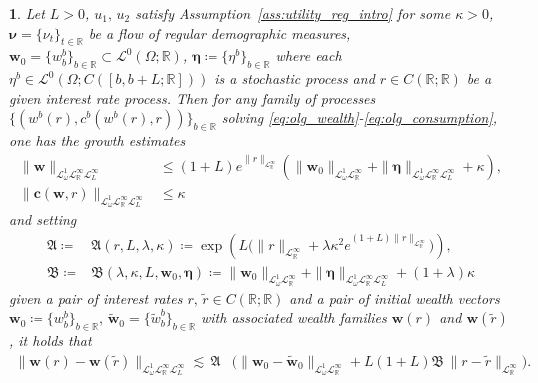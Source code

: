 \documentclass[11pt,oneside,english,reqno,dvipsnames,table]{amsart}
\numberwithin{equation}{section}
\theoremstyle{plain}
\theoremstyle{definition}
\theoremstyle{remark}
\theoremstyle{plain}
\newtheorem{lem}[thm]{\protect\lemmaname}
\theoremstyle{plain}
\theoremstyle{plain}
\theoremstyle{plain}
\theoremstyle{plain}
\theoremstyle{plain}
\theoremstyle{plain}
\providecommand{\lemmaname}{Lemma}
\newcommand{\red}[1]{#1}
\newcommand{\bc}{\mathbf{c}}
\newcommand{\bw}{\mathbf{w}}
\newcommand{\mbR}{\mathbb{R}}
\newcommand{\mfA}{\mathfrak{A}}
\newcommand{\mfB}{\mathfrak{B}}
\newcommand{\msL}{\mathscr{L}}
\newcommand{\bmeta}{\boldsymbol{\eta}}
\newcommand{\bnu}{\boldsymbol{\nu}}
\numberwithin{thm}{section}
\begin{document}
\begin{lem}\label{lem:olg_growth_stable}
	 Let $L>0$, $u_1,\, u_2$ satisfy Assumption~\ref{ass:utility_reg_intro} for some $\kappa >0$, $\bnu = \{\nu_t\}_{t\in \mbR}$ be a flow of \emph{regular demographic measures}, $\bw_0  = \{w^b_b\}_{b\in \mbR}\subset\msL^0(\Omega;\mbR)$, $\bmeta \coloneqq \{\eta^b\}_{b\in \mbR}$ where each $\eta^b \in \msL^0(\Omega;C([b,b+L;\mbR]))$ is a stochastic process and $r \in C(\mbR;\mbR)$ be a given interest rate process. %
     Then for any family of processes $\{(w^b(r),c^b(w^b(r),r))\}_{b\in \mbR}$ solving  \eqref{eq:olg_wealth}-\eqref{eq:olg_consumption}, one has the growth estimates
	 \begin{align}
	 	 \|\bw\|_{\msL^1_\omega \msL^\infty_{\mbR} \msL^\infty_{L}} &\leq  (1+L)e^{\|r\|_{\msL^\infty_{\mbR}}} \left(\|\bw_0\|_{\msL^1_\omega \msL^\infty_\mbR } +    \|\bmeta\|_{ \msL^1_\omega \msL^\infty_{\mbR} \msL^\infty_{L}} + \kappa \right), \label{eq:olg_wealth_apriori_bound} \\
          \|\bc(\bw,r)\|_{\msL^1_\omega  \msL^\infty_{\mbR}\msL^\infty_{L}}  &\leq \kappa \label{eq:olg_consumption_bdd}
	 \end{align}
	 and setting 
	 \begin{align*}
	 	\mfA\coloneqq & \mfA(r,L,\lambda,\kappa) \coloneqq \exp\left(L\big(\|r\|_{\msL^\infty_\mbR} + \lambda \kappa^2 e^{(1+L)\|r\|_{\msL^\infty_{\mbR}} } \big)\right),\\
       \mfB\coloneqq &\mfB(\lambda,\kappa,L,\bw_0,\bmeta) \coloneqq  \|\bw_0\|_{\msL^1_\omega \msL^\infty_\mbR } +    \|\bmeta\|_{\msL^1_\omega \msL^\infty_{\mbR} \msL^\infty_{L}}+ (1+\lambda)\kappa 
	 \end{align*}
	 given a pair of interest rates $r,\,\tilde{r} \in C(\mbR;\mbR)$ and a pair of initial wealth vectors $\bw_0 \coloneqq \{w^b_b\}_{b\in \mbR},\, \tilde{\bw}_0 = \{\tilde{w}^b_b\}_{b\in \mbR}$ with associated wealth families $\bw(r)$ and $\bw(\tilde{r})$, it holds that
\begin{equation}\label{eq:olg_wealth_rate_stability}
	 \begin{aligned}
	 		\|\bw(r)-\bw(\tilde{r})\|_{\msL^1_\omega \msL^\infty_\mbR  \msL^\infty_L} \lesssim \,\mfA &\bigg( \|\bw_0-\tilde{\bw}_0\|_{\msL^1_\omega \msL^\infty_\mbR } + L (1+L)\mfB   \,\|r-\tilde{r}\|_{\msL^\infty_\mbR}\bigg).
	 	\end{aligned}

\end{equation}
\end{lem}
\end{document}
